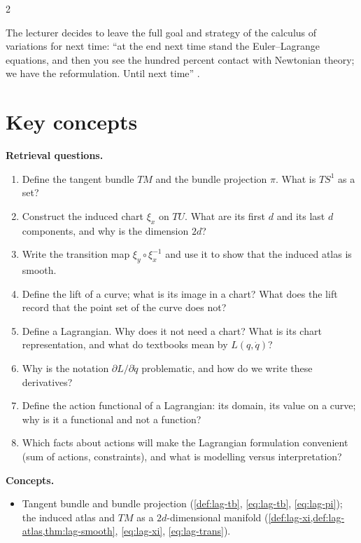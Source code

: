\begin{paracol}{2}
\begin{coursenote}\label{cn:lag-end}
The lecturer decides to leave the full goal and strategy of the calculus of variations for next time: ``at the end next time stand the Euler--Lagrange equations, and then you see the hundred percent contact with Newtonian theory; we have the reformulation. Until next time'' .
\end{coursenote}

\section*{Key concepts}
\begin{keyconcepts}
\textbf{Retrieval questions.}
\begin{enumerate}
  \item Define the tangent bundle $TM$ and the bundle projection $\pi$. What is $TS^1$ as a set?
  \item Construct the induced chart $\xi_x$ on $TU$. What are its first $d$ and its last $d$ components, and why is the dimension $2d$?
  \item Write the transition map $\xi_y\circ\xi_x^{-1}$ and use it to show that the induced atlas is smooth.
  \item Define the lift of a curve; what is its image in a chart? What does the lift record that the point set of the curve does not?
  \item Define a Lagrangian. Why does it not need a chart? What is its chart representation, and what do textbooks mean by $L(q,\dot q)$?
  \item Why is the notation $\partial L/\partial\dot q$ problematic, and how do we write these derivatives?
  \item Define the action functional of a Lagrangian: its domain, its value on a curve; why is it a functional and not a function?
  \item Which facts about actions will make the Lagrangian formulation convenient (sum of actions, constraints), and what is modelling versus interpretation?
\end{enumerate}
\textbf{Concepts.}
\begin{itemize}
  \item Tangent bundle and bundle projection (\cref{def:lag-tb}, \eqref{eq:lag-tb}, \eqref{eq:lag-pi}); the induced atlas and $TM$ as a $2d$-dimensional manifold (\cref{def:lag-xi,def:lag-atlas,thm:lag-smooth}, \eqref{eq:lag-xi}, \eqref{eq:lag-trans}).

\end{itemize}
\end{keyconcepts}
\end{paracol}
